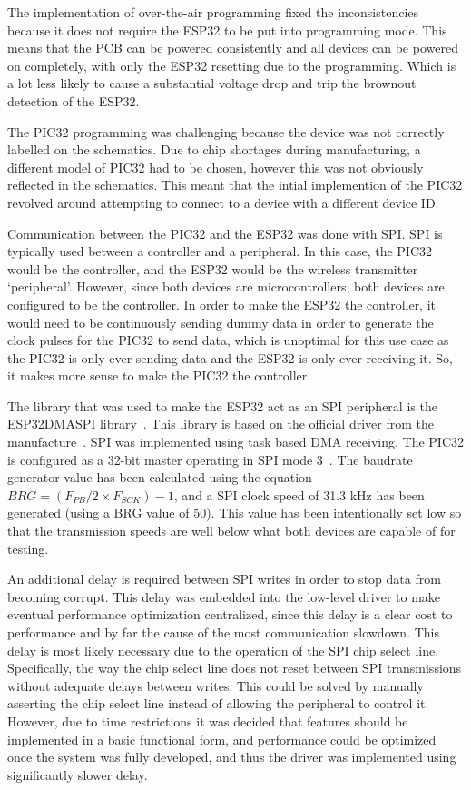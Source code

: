 The implementation of over-the-air programming fixed the inconsistencies because it does not require the ESP32 to be put into programming mode.
This means that the PCB can be powered consistently and all devices can be powered on completely, with only the ESP32 resetting due to the programming.
Which is a lot less likely to cause a substantial voltage drop and trip the brownout detection of the ESP32.

The PIC32 programming was challenging because the device was not correctly labelled on the schematics.
Due to chip shortages during manufacturing, a different model of PIC32 had to be chosen, however this was not obviously reflected in the schematics.
This meant that the intial implemention of the PIC32 revolved around attempting to connect to a device with a different device ID.

Communication between the PIC32 and the ESP32 was done with SPI.
SPI is typically used between a controller and a peripheral.
In this case, the PIC32 would be the controller, and the ESP32 would be the wireless transmitter `peripheral'.
However, since both devices are microcontrollers, both devices are configured to be the controller.
In order to make the ESP32 the controller,
it would need to be continuously sending dummy data in order to generate the clock pulses for the PIC32 to send data,
which is unoptimal for this use case as the PIC32 is only ever sending data and the ESP32 is only ever receiving it.
So, it makes more sense to make the PIC32 the controller.

The library that was used to make the ESP32 act as an SPI peripheral is the ESP32DMASPI library~\cite{ESP32DMASPI}.
This library is based on the official driver from the manufacture~\cite{SPI}.
SPI was implemented using task based DMA receiving.
The PIC32 is configured as a 32-bit master operating in SPI mode 3~\cite{Barry:2012}.
The baudrate generator value has been calculated using the equation \(BRG = (F_{PB} / 2 \times F_{SCK}) - 1\),
and a SPI clock speed of 31.3 kHz has been generated (using a BRG value of 50).
This value has been intentionally set low so that the transmission speeds are well below what both devices are capable of for testing.

An additional delay is required between SPI writes in order to stop data from becoming corrupt.
This delay was embedded into the low-level driver to make eventual performance optimization centralized,
since this delay is a clear cost to performance and by far the cause of the most communication slowdown.
This delay is most likely necessary due to the operation of the SPI chip select line.
Specifically, the way the chip select line does not reset between SPI transmissions without adequate delays between writes.
This could be solved by manually asserting the chip select line instead of allowing the peripheral to control it.
However, due to time restrictions it was decided that features should be implemented in a basic functional form,
and performance could be optimized once the system was fully developed,
and thus the driver was implemented using significantly slower delay.

